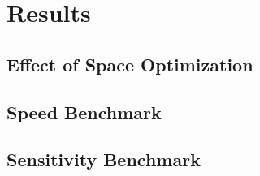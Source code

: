 \chapter{Results} \label{chapter:results}


\section{Effect of Space Optimization}

\section{Speed Benchmark}

\section{Sensitivity Benchmark}
